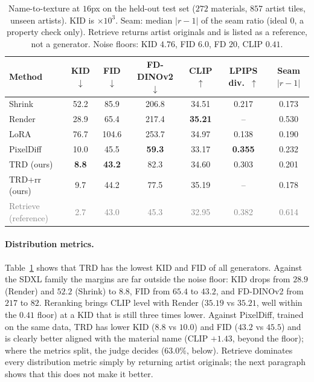 \documentclass{article}
\newcommand{\trd}{\textsc{TRD}}
\begin{document}
\begin{table}[t]
\caption{Name-to-texture at $16$px on the held-out test set ($272$ materials,
$857$ artist tiles, unseen artists). KID is $\times10^3$. Seam: median
$|r-1|$ of the seam ratio (ideal $0$, a property check only). Retrieve returns
artist originals and is listed as a reference, not a generator. Noise floors:
KID $4.76$, FID $6.0$, FD $20$, CLIP $0.41$.}
\label{tab:main}
\centering
\small\setlength{\tabcolsep}{5pt}
\begin{tabular}{@{}lcccccc@{}}
\toprule
Method & KID $\downarrow$ & FID $\downarrow$ & FD-DINOv2 $\downarrow$ & CLIP $\uparrow$ & LPIPS div.\ $\uparrow$ & Seam $|r{-}1|$ \\
\midrule
Shrink & 52.2 & 85.9 & 206.8 & 34.51 & 0.217 & 0.173 \\
Render & 28.9 & 65.4 & 217.4 & \textbf{35.21} & -- & 0.530 \\
LoRA & 76.7 & 104.6 & 253.7 & 34.97 & 0.138 & 0.190 \\
PixelDiff & 10.0 & 45.5 & \textbf{59.3} & 33.17 & \textbf{0.355} & 0.232 \\
\midrule
\trd{} (ours) & \textbf{8.8} & \textbf{43.2} & 82.3 & 34.60 & 0.303 & 0.201 \\
\trd{}+rr (ours) & 9.7 & 44.2 & 77.5 & 35.19 & -- & 0.178 \\
\midrule
\textcolor{gray}{Retrieve (reference)} & \textcolor{gray}{2.7} & \textcolor{gray}{43.0} & \textcolor{gray}{45.3} & \textcolor{gray}{32.95} & \textcolor{gray}{0.382} & \textcolor{gray}{0.614} \\
\bottomrule
\end{tabular}
\end{table}

\paragraph{Distribution metrics.} Table~\ref{tab:main} shows that \trd{} has
the lowest KID and FID of all generators. Against the SDXL family the margins
are far outside the noise floor: KID drops from $28.9$ (Render) and $52.2$ (Shrink) to
$8.8$, FID from $65.4$ to $43.2$, and FD-DINOv2 from $217$ to $82$. Reranking
brings CLIP level with Render ($35.19$ vs $35.21$, well within the $0.41$ floor)
at a KID that is still three times lower. Against PixelDiff, trained on the same data,
\trd{} has lower KID ($8.8$ vs $10.0$) and FID ($43.2$ vs $45.5$) and is
clearly better aligned with the material name (CLIP $+1.43$, beyond the
floor); where the metrics split, the judge decides ($63.0\%$, below). Retrieve dominates every
distribution metric simply by returning artist originals; the next paragraph
shows that this does not make it better.
\end{document}
